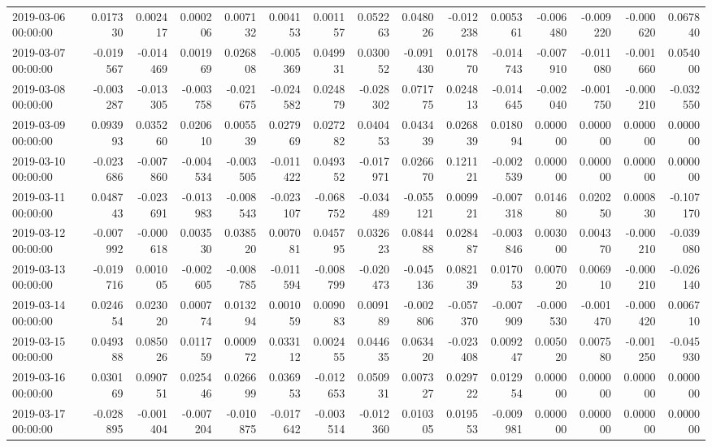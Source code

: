 \begin{tabular}{lrrrrrrrrrrrrrr}
2019-03-06 00:00:00 & 0.017330 & 0.002417 & 0.000206 & 0.007132 & 0.004153 & 0.001157 & 0.052263 & 0.048026 & -0.012238 & 0.005361 & -0.006480 & -0.009220 & -0.000620 & 0.067840 \\
2019-03-07 00:00:00 & -0.019567 & -0.014469 & 0.001969 & 0.026808 & -0.005369 & 0.049931 & 0.030052 & -0.091430 & 0.017870 & -0.014743 & -0.007910 & -0.011080 & -0.001660 & 0.054000 \\
2019-03-08 00:00:00 & -0.003287 & -0.013305 & -0.003758 & -0.021675 & -0.024582 & 0.024879 & -0.028302 & 0.071775 & 0.024813 & -0.014645 & -0.002040 & -0.001750 & -0.000210 & -0.032550 \\
2019-03-09 00:00:00 & 0.093993 & 0.035260 & 0.020610 & 0.005539 & 0.027969 & 0.027282 & 0.040453 & 0.043439 & 0.026839 & 0.018094 & 0.000000 & 0.000000 & 0.000000 & 0.000000 \\
2019-03-10 00:00:00 & -0.023686 & -0.007860 & -0.004534 & -0.003505 & -0.011422 & 0.049352 & -0.017971 & 0.026670 & 0.121121 & -0.002539 & 0.000000 & 0.000000 & 0.000000 & 0.000000 \\
2019-03-11 00:00:00 & 0.048743 & -0.023691 & -0.013983 & -0.008543 & -0.023107 & -0.068752 & -0.034489 & -0.055121 & 0.009921 & -0.007318 & 0.014680 & 0.020250 & 0.000830 & -0.107170 \\
2019-03-12 00:00:00 & -0.007992 & -0.000618 & 0.003530 & 0.038520 & 0.007081 & 0.045795 & 0.032623 & 0.084488 & 0.028487 & -0.003846 & 0.003000 & 0.004370 & -0.000210 & -0.039080 \\
2019-03-13 00:00:00 & -0.019716 & 0.001005 & -0.002605 & -0.008785 & -0.011594 & -0.008799 & -0.020473 & -0.045136 & 0.082139 & 0.017053 & 0.007020 & 0.006910 & -0.000210 & -0.026140 \\
2019-03-14 00:00:00 & 0.024654 & 0.023020 & 0.000774 & 0.013294 & 0.001059 & 0.009083 & 0.009189 & -0.002806 & -0.057370 & -0.007909 & -0.000530 & -0.001470 & -0.000420 & 0.006710 \\
2019-03-15 00:00:00 & 0.049388 & 0.085026 & 0.011759 & 0.000972 & 0.033112 & 0.002455 & 0.044635 & 0.063420 & -0.023408 & 0.009247 & 0.005020 & 0.007580 & -0.001250 & -0.045930 \\
2019-03-16 00:00:00 & 0.030169 & 0.090751 & 0.025446 & 0.026699 & 0.036953 & -0.012653 & 0.050931 & 0.007327 & 0.029722 & 0.012954 & 0.000000 & 0.000000 & 0.000000 & 0.000000 \\
2019-03-17 00:00:00 & -0.028895 & -0.001404 & -0.007204 & -0.010875 & -0.017642 & -0.003514 & -0.012360 & 0.010305 & 0.019553 & -0.009981 & 0.000000 & 0.000000 & 0.000000 & 0.000000 \\

\end{tabular}

